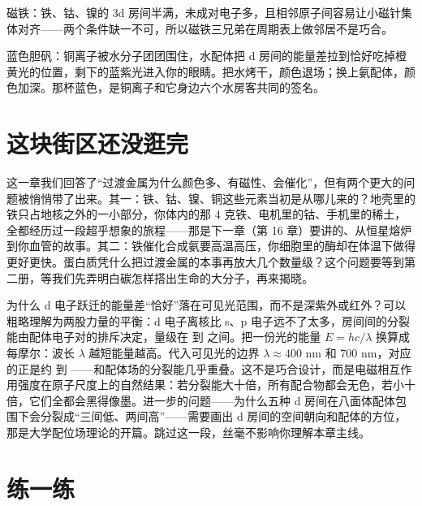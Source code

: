 磁铁：铁、钴、镍的 3d 房间半满，未成对电子多，且相邻原子间容易让小磁针集体对齐——两个条件缺一不可，所以磁铁三兄弟在周期表上做邻居不是巧合。

蓝色胆矾：铜离子被水分子团团围住，水配体把 d 房间的能量差拉到恰好吃掉橙黄光的位置，剩下的蓝紫光进入你的眼睛。把水烤干，颜色退场；换上氨配体，颜色加深。那杯蓝色，是铜离子和它身边六个水房客共同的签名。

\section{这块街区还没逛完}

这一章我们回答了“过渡金属为什么颜色多、有磁性、会催化”，但有两个更大的问题被悄悄带了出来。其一：铁、钴、镍、铜这些元素当初是从哪儿来的？地壳里的铁只占地核之外的一小部分，你体内的那 4 克铁、电机里的钴、手机里的稀土，全都经历过一段超乎想象的旅程——那是下一章（第 16 章）要讲的、从恒星熔炉到你血管的故事。其二：铁催化合成氨要高温高压，你细胞里的酶却在体温下做得更好更快。蛋白质凭什么把过渡金属的本事再放大几个数量级？这个问题要等到第二册，等我们先弄明白碳怎样搭出生命的大分子，再来揭晓。

\begin{tiaozhan}
为什么 d 电子跃迁的能量差“恰好”落在可见光范围，而不是深紫外或红外？可以粗略理解为两股力量的平衡：d 电子离核比 s、p 电子远不了太多，房间间的分裂能由配体电子对的排斥决定，量级在  到  之间。把一份光的能量 $E = hc/\lambda$ 换算成每摩尔：波长 $\lambda$ 越短能量越高。代入可见光的边界 $\lambda \approx 400$ nm 和 $700$ nm，对应的正是约  到 ——和配体场的分裂能几乎重叠。这不是巧合设计，而是电磁相互作用强度在原子尺度上的自然结果：若分裂能大十倍，所有配合物都会无色，若小十倍，它们全都会黑得像墨。进一步的问题——为什么五种 d 房间在八面体配体包围下会分裂成“三间低、两间高”——需要画出 d 房间的空间朝向和配体的方位，那是大学配位场理论的开篇。跳过这一段，丝毫不影响你理解本章主线。
\end{tiaozhan}

\section*{练一练}

